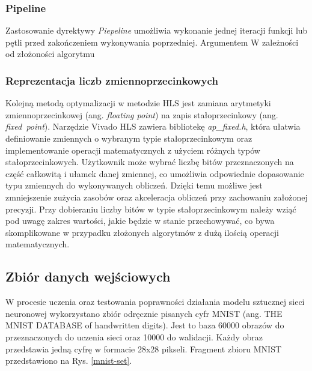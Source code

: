 \subsubsection{Pipeline}
Zastosowanie dyrektywy \emph{Piepeline} umożliwia wykonanie jednej iteracji funkcji lub pętli przed zakończeniem wykonywania poprzedniej. Argumentem
W zależności od złożoności algorytmu 


\subsubsection{Reprezentacja liczb zmiennoprzecinkowych}

Kolejną metodą optymalizacji w metodzie HLS jest zamiana arytmetyki zmiennoprzecinkowej (ang. \emph{floating point}) na zapis 
stałoprzecinkowy (ang. \emph{fixed\ point}). Narzędzie Vivado HLS zawiera bibliotekę \emph{ap\_fixed.h}, która ułatwia 
definiowanie zmiennych o wybranym typie stałoprzecinkowym oraz implementowanie operacji matematycznych z użyciem różnych 
typów stałoprzecinkowych. Użytkownik może wybrać liczbę bitów przeznaczonych na część całkowitą i ułamek danej zmiennej, co umożliwia odpowiednie dopasowanie typu zmiennych do wykonywanych obliczeń. Dzięki temu możliwe jest zmniejszenie zużycia zasobów oraz akceleracja obliczeń przy zachowaniu założonej precyzji. Przy dobieraniu liczby bitów w typie stałoprzecinkowym należy wziąć pod uwagę zakres wartości, jakie będzie w stanie przechowywać, co bywa skomplikowane w przypadku złożonych algorytmów z dużą ilością operacji matematycznych. 




\subsection{Zbiór danych wejściowych}

W procesie uczenia oraz testowania poprawności działania modelu sztucznej 
sieci neuronowej wykorzystano zbiór odręcznie pisanych cyfr MNIST 
(ang. THE MNIST DATABASE of handwritten digits)\cite{lecun-mnisthandwrittendigit-2010}. Jest to baza 60000 obrazów do 
przeznaczonych do uczenia sieci oraz 10000 do walidacji. Każdy obraz przedstawia jedną cyfrę w formacie 28x28 pikseli. 
Fragment zbioru MNIST przedstawiono na Rys. \ref{mnist-set}.

